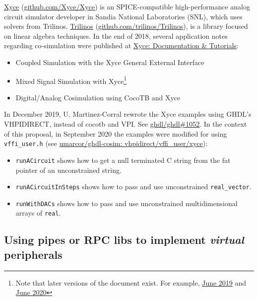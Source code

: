 \documentclass[
]{article}
\providecommand{\tightlist}{%
  \setlength{\itemsep}{0pt}\setlength{\parskip}{0pt}}
\begin{document}
\href{https://xyce.sandia.gov/}{Xyce} (\href{https://github.com/Xyce/Xyce}{github.com/Xyce/Xyce}) is an SPICE-compatible high-performance analog circuit simulator developer in Sandia National Laboratories (SNL), which uses solvers from Trilinos. \href{https://trilinos.github.io/}{Trilinos} (\href{https://github.com/trilinos/Trilinos}{github.com/trilinos/Trilinos}), is a library focused on linear algebra techniques. In the end of 2018, several application notes regarding co-simulation were published at \href{https://xyce.sandia.gov/documentation/index.html}{Xyce: Documentation \& Tutorials}:

\begin{itemize}
\tightlist
\item
  Coupled Simulation with the Xyce General External Interface \autocite{xyce-gei}
\item
  Mixed Signal Simulation with Xyce\footnote{Note that later versions of the document exist. For example, \href{https://xyce.sandia.gov/downloads/_assets/documents/AppNote-MixedSignal_6.11.pdf}{June 2019} and \href{https://xyce.sandia.gov/downloads/_assets/documents/AppNote-MixedSignal.pdf}{June 2020}} \autocite{xyce-mixed}
\item
  Digital/Analog Cosimulation using CocoTB and Xyce \autocite{xyce-cocotb}
\end{itemize}

In December 2019, U. Martinez-Corral rewrote the Xyce examples using GHDL's VHPIDIRECT, instead of cocotb and VPI. See \href{https://github.com/ghdl/ghdl/issues/1052}{ghdl/ghdl\#1052}. In the context of this proposal, in September 2020 the examples were modified for using \texttt{vffi\_user.h} (see \href{https://umarcor.github.io/ghdl-cosim/vhpidirect/examples/vffi_user.html\#xyce}{umarcor/ghdl-cosim: vhpidirect/vffi\_user/xyce}):

\begin{itemize}
\tightlist
\item
  \texttt{runACircuit} shows how to get a null terminated C string from the fat pointer of an unconstrained string.
\item
  \texttt{runACircuitInSteps} shows how to pass and use unconstrained \texttt{real\_vector}.
\item
  \texttt{runWithDACs} shows how to pass and use unconstrained multidimensional arrays of \texttt{real}.
\end{itemize}

\hypertarget{using-pipes-or-rpc-libs-to-implement-virtual-peripherals}{%
\subsection{\texorpdfstring{Using pipes or RPC libs to implement \emph{virtual} peripherals}{Using pipes or RPC libs to implement virtual peripherals}}\label{using-pipes-or-rpc-libs-to-implement-virtual-peripherals}}
\end{document}
